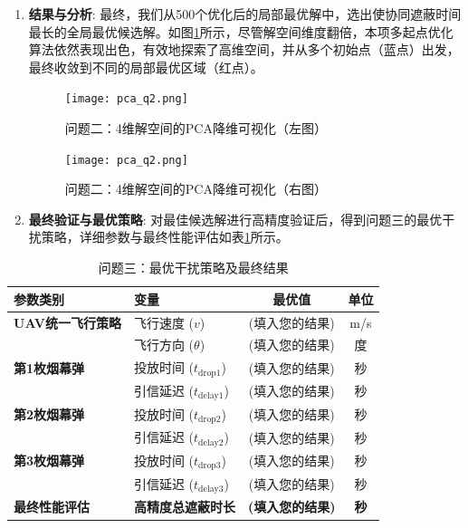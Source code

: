 \documentclass[12pt]{article}
\begin{document}
\begin{CJK}{UTF8}{gbsn}
\begin{enumerate}
			\item \textbf{结果与分析}: 最终，我们从500个优化后的局部最优解中，选出使协同遮蔽时间最长的全局最优候选解。如图\ref{fig:3}所示，尽管解空间维度翻倍，本项多起点优化算法依然表现出色，有效地探索了高维空间，并从多个初始点（蓝点）出发，最终收敛到不同的局部最优区域（红点）。
			
			\begin{figure}[H]
				\centering
				\begin{minipage}{0.48\textwidth}
					\centering
					\texttt{[image: pca\_q2.png]} %
					\caption{问题二：4维解空间的PCA降维可视化（左图）}
					\label{fig:4}
				\end{minipage}
				\hfill %
				\begin{minipage}{0.48\textwidth}
					\centering
					\texttt{[image: pca\_q2.png]} %
					\caption{问题二：4维解空间的PCA降维可视化（右图）}
					\label{fig:3}
				\end{minipage}
			\end{figure}
			
			
			\item \textbf{最终验证与最优策略}: 对最佳候选解进行高精度验证后，得到问题三的最优干扰策略，详细参数与最终性能评估如表\ref{tab:results_q3}所示。
		\end{enumerate}
		
		\begin{table}[H]
			\centering
			\caption{问题三：最优干扰策略及最终结果}
			\label{tab:results_q3}
			\begin{tabular}{@{}llcc@{}}
				\toprule
				参数类别           & 变量                & 最优值      & 单位 \\ \midrule
				\textbf{UAV统一飞行策略} & 飞行速度 ($v$)        & (填入您的结果) & m/s  \\
				& 飞行方向 ($\theta$)     & (填入您的结果) & 度   \\ \midrule
				\textbf{第1枚烟幕弹} & 投放时间 ($t_{\text{drop1}}$) & (填入您的结果) & 秒   \\
				& 引信延迟 ($t_{\text{delay1}}$) & (填入您的结果) & 秒   \\ \midrule
				\textbf{第2枚烟幕弹} & 投放时间 ($t_{\text{drop2}}$) & (填入您的结果) & 秒   \\
				& 引信延迟 ($t_{\text{delay2}}$) & (填入您的结果) & 秒   \\ \midrule
				\textbf{第3枚烟幕弹} & 投放时间 ($t_{\text{drop3}}$) & (填入您的结果) & 秒   \\
				& 引信延迟 ($t_{\text{delay3}}$) & (填入您的结果) & 秒   \\ \midrule
				\textbf{最终性能评估} & \textbf{高精度总遮蔽时长} & \textbf{(填入您的结果)} & \textbf{秒}   \\ \bottomrule
			\end{tabular}
		\end{table}
		

\end{CJK}
\end{document}
